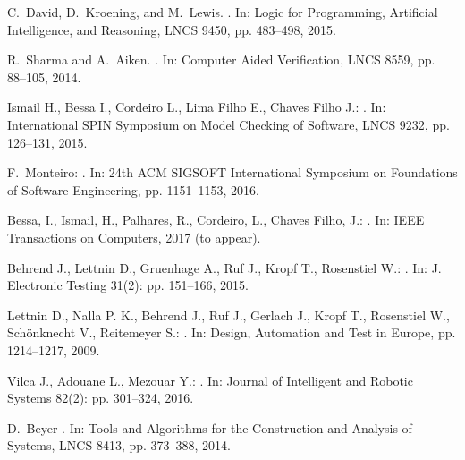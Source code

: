 \documentclass{acm_sen_article}
\begin{document}
{{\begin{thebibliography}{1}
C.~David, D.~Kroening, and M.~Lewis.
.
\newblock In: Logic for Programming, Artificial Intelligence, and Reasoning, LNCS 9450, pp. 483--498, 2015.

R.~Sharma and A.~Aiken.
.
\newblock In: Computer Aided Verification, LNCS 8559, pp. 88--105, 2014.

Ismail H., Bessa I., Cordeiro L., Lima Filho E., Chaves Filho J.:
. 
\newblock In: International SPIN Symposium on Model Checking of Software, LNCS 9232, pp. 126--131, 2015.

F.~Monteiro:
. 
\newblock In: 24th {ACM} {SIGSOFT} International Symposium on Foundations of Software Engineering, pp. 1151--1153, 2016.

Bessa, I., Ismail, H., Palhares, R., Cordeiro, L., Chaves Filho, J.:
. 
\newblock In: IEEE Transactions on Computers, 2017 (to appear).

Behrend J., Lettnin D., Gruenhage A., Ruf J., Kropf T., Rosenstiel W.:
. 
\newblock In: J. Electronic Testing 31(2): pp. 151--166, 2015.

Lettnin D., Nalla P. K., Behrend J., Ruf J., Gerlach J., Kropf T., Rosenstiel W., Sch{\"o}nknecht V., Reitemeyer S.:
. 
\newblock In: Design, Automation and Test in Europe, pp. 1214--1217, 2009.

Vilca J., Adouane L., Mezouar Y.:
. 
\newblock In: Journal of Intelligent and Robotic Systems 82(2): pp. 301--324, 2016.

D.~Beyer 
. 
\newblock In: Tools and Algorithms for the Construction and Analysis of Systems, LNCS 8413, pp. 373--388, 2014.
 

\end{thebibliography}}}
\end{document}
